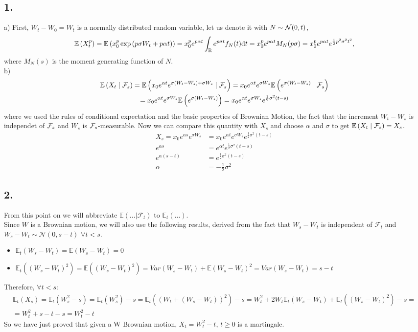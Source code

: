 \subsection*{1.}
a) First, $W_t-W_0=W_t$ is a normally distributed random variable, let us denote it with $N\sim\mathcal{N}(0, t)$,
\begin{gather*}
    \mathbb{E}\left( X_t^p \right)= \mathbb{E}\left( x_0^p \exp{(p\sigma W_t+p\alpha t)} \right) = x_0^p e^{p\alpha t} \int_{\mathbb{R}} e^{p \sigma t} f_{N}(t)\mathrm{d}t = x_0^p e^{p \alpha t} M_N(p\sigma) = x_0^p e^{p \alpha t} e^{\frac{1}{2}p^2\sigma^2 t^2},
\end{gather*}
where $M_N(s)$ is the moment generating function of $N$. \\
b)
\begin{gather*}
    \mathbb{E}\left( X_t \mid \mathcal{F}_{s} \right) = \mathbb{E}\left( x_0 e ^{\alpha t} e^{\sigma(W_t-W_s)+\sigma W_s} \mid \mathcal{F}_{s} \right) 
    = x_0 e^{\alpha t} e^{\sigma W_s} \mathbb{E}\left( e^{\sigma (W_t-W_s)} \mid \mathcal{F}_{s} \right) \\
    =x_0 e^{\alpha t} e^{\sigma W_s} \mathbb{E}\left( e^{\sigma (W_t-W_s)} \right) 
    = x_0 e^{\alpha t} e^{\sigma W_s} e^{\frac{1}{2}\sigma^2(t-s)}
\end{gather*}
where we used the rules of conditional expectation and the basic properties of Brownian Motion, the fact that the increment $W_t-W_s$ is independet of $\mathcal{F}_{s}$ and $W_s$ is $\mathcal{F}_{s}$-measurable. Now we can compare this quantity with $X_s$ and choose $\alpha$ and $\sigma$ to get $\mathbb{E}\left( X_t \mid \mathcal{F}_{s} \right)=X_s$.
\begin{align*}
    X_s = x_0 e^{\alpha s}e^{\sigma W_s} &= x_0 e^{\alpha t} e^{\sigma W_s} e^{\frac{1}{2}\sigma^2(t-s)} \\
    e^{\alpha s} &=e^{\alpha t}  e^{\frac{1}{2}\sigma^2(t-s)} \\
    e^{\alpha (s-t)} &=e^{\frac{1}{2}\sigma^2(t-s)} \\
    \alpha &= -\frac{1}{2}\sigma^2
\end{align*}


\subsection*{2.}
From this point on we will abbreviate $\mathbb{E}(...|\mathcal{F}_t)$ to $\mathbb{E}_t(...)$.\\
Since $W$ is a Brownian motion, we will also use the following results, derived from the fact that $W_s -W_t$ is independent of $\mathcal{F}_t$ and $W_s -W_t \sim \mathcal{N}(0,s-t)$ $\forall t < s$.
\begin{itemize}
    \item $\mathbb{E}_t(W_s-W_t)=\mathbb{E}(W_s-W_t)=0$
    \item $\mathbb{E}_t((W_s-W_t)^2)=\mathbb{E}((W_s-W_t)^2)=Var(W_s-W_t)+\mathbb{E}(W_s-W_t)^2=Var(W_s-W_t)=s-t$
\end{itemize}
Therefore, $\forall t<s$:
\begin{gather*}
    \mathbb{E}_t(X_s)=\mathbb{E}_t(W_s^2-s)=\mathbb{E}_t(W_s^2)-s=\mathbb{E}_t((W_t+(W_s-W_t))^2)-s=W_t^2+2W_t\mathbb{E}_t(W_s-W_t)+\mathbb{E}_t((W_s-W_t)^2)-s=\\
    =W_t^2+s-t-s=W_t^2-t
\end{gather*}
So we have just proved that given a W Brownian motion, $X_t=W_t^2-t$, $t \geq 0$ is a martingale.
